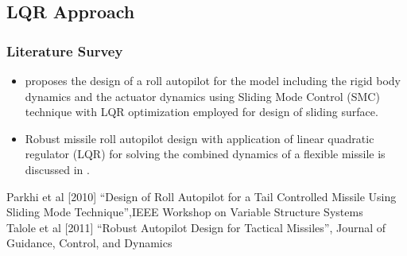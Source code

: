 \documentclass[10pt]{beamer}
\begin{document}
\subsection{LQR Approach}
\begin{frame}
\frametitle{Literature Survey}
\begin{itemize}
\item \cite{parkhi2010} proposes the design of a roll autopilot for the model including the rigid body dynamics and the actuator dynamics using Sliding Mode Control (SMC) technique with LQR optimization employed for design of sliding surface. \bigskip
 \item Robust missile roll autopilot design with application of linear quadratic regulator (LQR) for solving the combined dynamics of a flexible missile is discussed in \cite{talolekolhe2011}.  \bigskip
\end{itemize}
\vspace{.5cm}
\footnoterule
\tiny {\cite{parkhi2010} Parkhi et al [2010] ``Design of Roll Autopilot for a Tail Controlled Missile Using Sliding Mode Technique'',IEEE Workshop on Variable Structure Systems} \\
\tiny {\cite{talolekolhe2011} Talole et al [2011] ``Robust Autopilot Design for Tactical Missiles'', Journal of Guidance, Control, and Dynamics}
\end{frame}
\end{document}
